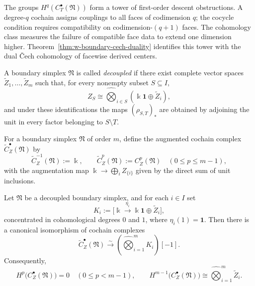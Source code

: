 \begin{remark}[Interpretation]
\label{rem:w-boundary-cech-interpretation}
The groups $H^q(C_T^\bullet(\mathfrak N))$ form a tower of first-order descent obstructions.
A degree-$q$ cochain assigns couplings to all faces of codimension $q$; the cocycle condition
requires compatibility on codimension-$(q+1)$ faces. The cohomology class measures
the failure of compatible face data to extend one dimension higher.
Theorem~\ref{thm:w-boundary-cech-duality} identifies this tower with the dual \v{C}ech cohomology of
facewise derived centers.
\end{remark}

\begin{definition}
\label{def:w-decoupled-simplex}
A boundary simplex $\mathfrak N$ is called \emph{decoupled} if there exist complete vector spaces
$\widetilde Z_1,\dots,\widetilde Z_m$ such that, for every nonempty subset $S\subseteq I$,
\[
Z_S\cong \widehat\bigotimes_{i\in S}(\Bbbk\mathbf{1}\oplus \widetilde Z_i),
\]
and under these identifications the maps $(\rho_{S,T})_*$ are obtained by adjoining the unit in every
factor belonging to $S\setminus T$.
\end{definition}

\begin{definition}
\label{def:w-augmented-center-complex}
For a boundary simplex $\mathfrak N$ of order $m$, define the augmented cochain complex
$\widetilde C_Z^\bullet(\mathfrak N)$ by
\[
\widetilde C_Z^{-1}(\mathfrak N):=\Bbbk,
\qquad
\widetilde C_Z^p(\mathfrak N):=C_Z^p(\mathfrak N)\quad (0\le p\le m-1),
\]
with the augmentation map $\Bbbk\to \bigoplus_i Z_{\{i\}}$ given by the direct sum of unit inclusions.
\end{definition}

\begin{theorem}
\label{thm:w-augmented-center-tensor-model}
Let $\mathfrak N$ be a decoupled boundary simplex, and for each $i\in I$ set
\[
K_i:=\bigl[\Bbbk\xrightarrow{\eta_i} \Bbbk\mathbf{1}\oplus \widetilde Z_i\bigr],
\]
concentrated in cohomological degrees $0$ and $1$, where $\eta_i(1)=\mathbf{1}$.
Then there is a canonical isomorphism of cochain complexes
\[
\widetilde C_Z^\bullet(\mathfrak N)
\xrightarrow{\sim}
\left(\widehat\bigotimes_{i=1}^m K_i\right)[-1].
\]
Consequently,
\[
H^p\bigl(C_Z^\bullet(\mathfrak N)\bigr)=0
\quad (0\le p<m-1),
\qquad
H^{m-1}\bigl(C_Z^\bullet(\mathfrak N)\bigr)
\cong
\widehat\bigotimes_{i=1}^m \widetilde Z_i.
\]
\end{theorem}

